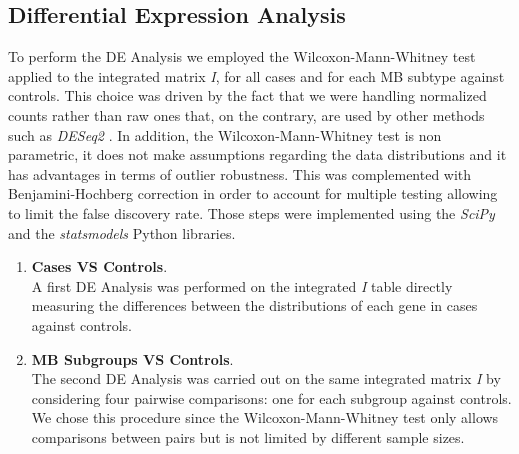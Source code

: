 \documentclass[10pt]{SelfArx} %
\begin{document}
\subsection{Differential Expression Analysis}\label{sec:DE_Analysis}
To perform the DE Analysis we employed the Wilcoxon-Mann-Whitney test applied to the integrated matrix \textit{I}, for all cases and for each MB subtype against controls. This choice was driven by the fact that we were handling normalized counts rather than raw ones that, on the contrary, are used by other methods such as \textit{DESeq2} \cite{love2014moderated}. In addition, the Wilcoxon-Mann-Whitney test is non parametric, it does not make assumptions regarding the data distributions and it has advantages in terms of outlier robustness.
This was complemented with Benjamini-Hochberg correction in order to account for multiple testing allowing to limit the false discovery rate.
Those steps were implemented using the \textit{SciPy}
\cite{jones2001scipy} and the \textit{statsmodels} \cite{seabold2010statsmodels} Python libraries.
\begin{enumerate}
    \item \textbf{Cases VS Controls}.\\
    A first DE Analysis was performed on the integrated \textit{I} table directly measuring the differences between the distributions of each gene in cases against controls. 
    \item \textbf{MB Subgroups VS Controls}.\\
    The second DE Analysis was carried out on the same integrated matrix \textit{I} by considering four pairwise comparisons: one for each subgroup against controls.
    We chose this procedure since the Wilcoxon-Mann-Whitney test only allows comparisons between pairs but is not limited by different sample sizes.
\end{enumerate}
\end{document}
